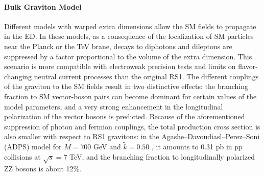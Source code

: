 \paragraph{Bulk Graviton Model}

Different models with warped extra dimensions allow the SM fields to propagate in the ED. In these models, as a consequence of the localization of SM particles near the Planck or the TeV brane, decays to diphotons and dileptons are suppressed by a factor proportional to the volume of the extra dimension. This scenario is more compatible with electroweak precision tests and limits on flavor-changing neutral current processes than the original RS1. The different couplings of the graviton to the SM fields result in two distinctive effects: the branching fraction to SM vector-boson pairs can become dominant for certain values of the model parameters, and a very strong enhancement in the longitudinal polarization of the vector bosons is predicted. Because of the aforementioned suppression of photon and fermion couplings, the total production cross section is also smaller with respect to RS1 gravitons: in the Agashe–Davoudiasl–Perez–Soni (ADPS) model \cite{Agashe:2007zd} for $M = 700$ GeV and $\tilde{k}= 0.50$ , it amounts to 0.31 pb in pp collisions at $\sqrt{s} = 7$ TeV, and the branching fraction to longitudinally polarized ZZ bosons is about 12$\%$.



